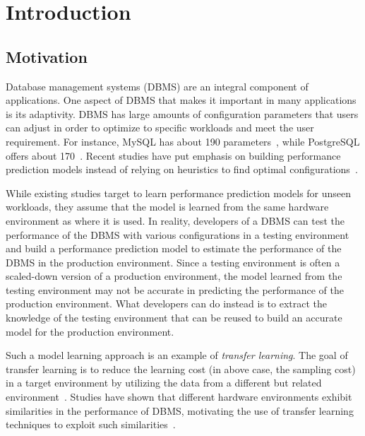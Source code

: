 \section{Introduction}
\subsection{Motivation}\label{motivation}
Database management systems (DBMS) are an integral component of applications. One aspect of DBMS that makes it important in many applications is its adaptivity. DBMS has large amounts of configuration parameters that users can adjust in order to optimize to specific workloads and meet the user requirement. For instance, MySQL has about 190 parameters~\cite{mysql197}, while PostgreSQL offers about 170~\cite{postgre170, cdbtune}. Recent studies have put emphasis on building performance prediction models instead of relying on heuristics to find optimal configurations~\cite{iTune, Ottertune, Onlinetune, cdbtune, restune}.

While existing studies target to learn performance prediction models for unseen workloads, they assume that the model is learned from the same hardware environment as where it is used.
In reality, developers of a DBMS can test the performance of the DBMS with various configurations in a testing environment and build a performance prediction model to estimate the performance of the DBMS in the production environment\cite{Matsuura}.
Since a testing environment is often a scaled-down version of a production environment, the model learned from the testing environment may not be accurate in predicting the performance of the production environment.
What developers can do instead is to extract the knowledge of the testing environment that can be reused to build an accurate model for the production environment.

Such a model learning approach is an example of \textit{transfer learning}.
The goal of transfer learning is to reduce the learning cost (in above case, the sampling cost) in a target environment by utilizing the data from a different but related environment~\cite{l2s, datareuse}.
Studies have shown that different hardware environments exhibit similarities in the performance of DBMS, motivating the use of transfer learning techniques to exploit such similarities~\cite{Valov, jamshidi}.


